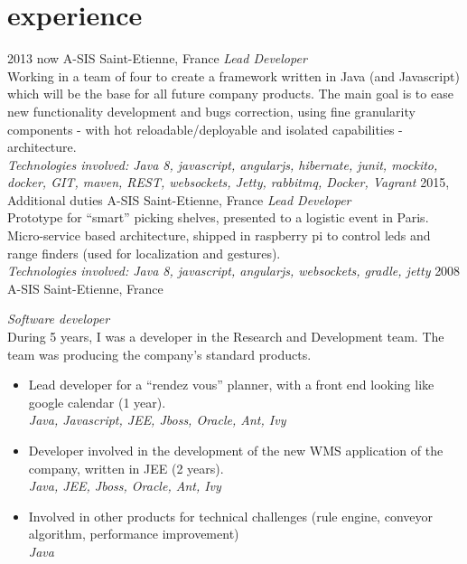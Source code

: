 \documentclass[]{k-cv} %
\begin{document}
\section{experience}

\begin{entrylist}
\entry
{2013 \to now}
{A-SIS}
{Saint-Etienne, France}
{\emph{Lead Developer} \\
Working in a team of four to create a framework written in Java (and Javascript) which
 will be the base for all future company products.
The main goal is to ease new functionality development and bugs correction,
  using fine granularity components - with hot reloadable/deployable and isolated capabilities - architecture. \\
\emph{
Technologies involved:
Java 8, javascript, angularjs, hibernate, junit, mockito, docker,
GIT, maven, REST, websockets, Jetty, rabbitmq, Docker, Vagrant
}}
\entry
{2015, Additional duties}
{A-SIS}
{Saint-Etienne, France}
{\emph{Lead Developer} \\
Prototype for “smart” picking shelves, presented to a logistic event in Paris.
Micro-service based architecture, shipped in raspberry pi to control leds and range finders
(used for localization and gestures). \\
\emph{
Technologies involved:
Java 8, javascript, angularjs, websockets,  gradle, jetty
}}
\entry
{2008 }
{A-SIS}
{Saint-Etienne, France}
{\emph{Software developer} \\
During 5 years, I was a developer in the Research and Development team.
The team was producing the company’s standard products.
\begin{itemize}
\item
Lead developer for a “rendez vous” planner, with a front end looking like google calendar (1 year). \\
\emph{Java, Javascript, JEE, Jboss, Oracle, Ant, Ivy}
\item
Developer involved in the development of the new WMS application of the company, written in JEE (2 years). \\
\emph{Java, JEE, Jboss, Oracle, Ant, Ivy}
\item
Involved in other products for technical challenges (rule engine, conveyor algorithm, performance improvement) \\
\emph{Java}
\end{itemize}}
\end{entrylist}
\end{document}
